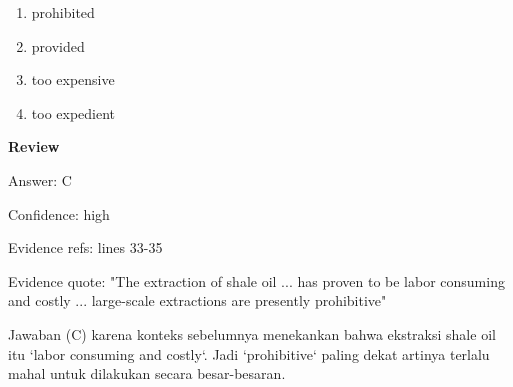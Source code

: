 \documentclass[12pt]{article}
\begin{document}
\begin{enumerate}[label=(\Alph*),leftmargin=*,itemsep=0.2em]
\item prohibited
\item provided
\item too expensive
\item too expedient
\end{enumerate}
\par
\begingroup
\setlength{\parskip}{0pt}
\setlength{\parindent}{0pt}
\textbf{Review}\par
Answer: C\par
Confidence: high\par
Evidence refs: lines 33-35\par
Evidence quote: "The extraction of shale oil ... has proven to be labor consuming and costly ... large-scale extractions are presently prohibitive"\par
Jawaban (C) karena konteks sebelumnya menekankan bahwa ekstraksi shale oil itu `labor consuming and costly`. Jadi `prohibitive` paling dekat artinya terlalu mahal untuk dilakukan secara besar-besaran.\par
\endgroup
\par
\vspace{0.25\baselineskip}
\end{document}
